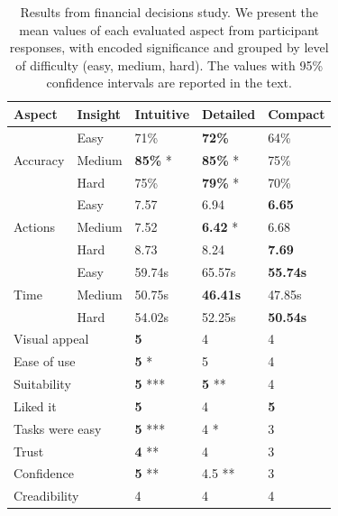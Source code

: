 \documentclass[final,5p,times,twocolumn,authoryear]{elsarticle}
\begin{document}
\def\arraystretch{1.5}
\begin{table}[t]
  \centering
  \caption{Results from financial decisions study. We present the mean values of each evaluated aspect from participant responses, with encoded significance and grouped by level of difficulty (easy, medium, hard). The values with 95\% confidence intervals are reported in the text.}
    \begin{tabular}{l l l l l }
    \textbf{Aspect} & \textbf{Insight} & \textbf{Intuitive} & \textbf{Detailed} & \textbf{Compact} \\ 
    \hline
    \multirow{3}{*}{Accuracy} & Easy   & 71\% & \textbf{72\%}   & 64\% \\
                              & Medium & \textbf{85\%} *        & \textbf{85\%} * & 75\% \\
                              & Hard   & 75\% & \textbf{79\%} * & 70\% \\
    \hline
    \multirow{3}{*}{Actions} & Easy   & 7.57 & 6.94 & \textbf{6.65} \\
                             & Medium & 7.52 & \textbf{6.42} * & 6.68 \\ 
                             & Hard   & 8.73 & 8.24 & \textbf{7.69} \\
    \hline
    \multirow{3}{*}{Time} & Easy & 59.74s & 65.57s & \textbf{55.74s} \\
    & Medium & 50.75s & \textbf{46.41s} & 47.85s \\
    & Hard   & 54.02s & 52.25s & \textbf{50.54s} \\
    \hline
    \multicolumn{2}{l}{Visual appeal    } & \textbf{5} & 4 & 4 \\    
    \multicolumn{2}{l}{Ease of use      } & \textbf{5} * & 5 & 4 \\
    \multicolumn{2}{l}{Suitability      } & \textbf{5} *** & \textbf{5} ** & 4 \\
    \multicolumn{2}{l}{Liked it         } & \textbf{5} & 4 & \textbf{5} \\
    \multicolumn{2}{l}{Tasks were easy  } & \textbf{5} *** & 4 * & 3 \\
    \multicolumn{2}{l}{Trust            } & \textbf{4} **  & 4 & 3 \\
    \multicolumn{2}{l}{Confidence       } & \textbf{5} ** & 4.5 ** & 3 \\
    \multicolumn{2}{l}{Creadibility      } & 4 & 4 & 4   \\

\end{tabular}
\end{table}
\end{document}

